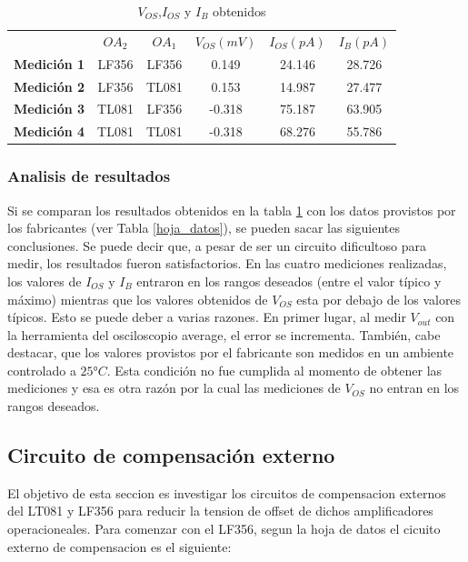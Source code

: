 \begin{table}[ht]
    \centering
    \caption{$V_{OS}$,$I_{OS}$ y $I_B$ obtenidos}
    \label{table5}
    \begin{tabular}{@{}cccccc@{}}
    \textbf{}           & \textbf{$OA_2$} & \textbf{$OA_1$} & \textbf{$V_{OS} (mV)$}   & \textbf{$I_{OS} (pA)$} & \textbf{$I_B (pA)$} \\ 
    \textbf{Medición 1} & LF356          & LF356      & 0.149                          & 24.146                 & 28.726             \\
    \textbf{Medición 2} & LF356          & TL081      & 0.153                          & 14.987                 & 27.477                  \\
    \textbf{Medición 3} & TL081          & LF356      & -0.318                         & 75.187                 & 63.905                  \\
    \textbf{Medición 4} & TL081          & TL081      & -0.318                         & 68.276                 & 55.786                  \\ 
    \end{tabular}
\end{table}


\subsubsection{Analisis de resultados}
Si se comparan los resultados obtenidos en la tabla \ref{table5} con los datos provistos por los fabricantes (ver Tabla \ref{hoja_datos}), se pueden sacar las siguientes conclusiones. Se puede decir que, a pesar de 
ser un circuito dificultoso para medir, los resultados fueron satisfactorios. En las cuatro mediciones realizadas, los valores de $I_{OS}$ y $I_B$ entraron en los rangos deseados (entre el valor típico y máximo) mientras 
que los valores obtenidos de $V_{OS}$ esta por debajo de los valores típicos. Esto se puede deber a varias razones. En primer lugar, al medir $V_{out}$ con la herramienta del osciloscopio average, el error se incrementa. También, cabe destacar, que
los valores provistos por el fabricante son medidos en un ambiente controlado a $25 °C$. Esta condición no fue cumplida al momento de obtener las mediciones y esa es otra razón por la cual las mediciones de $V_{OS}$ no entran en los rangos deseados.   

\subsection{Circuito de compensación externo}
El objetivo de esta seccion es investigar los circuitos de compensacion externos del LT081 y LF356 para reducir la tension de offset de dichos amplificadores operacioneales.
Para comenzar con el LF356, segun la hoja de datos el cicuito externo de compensacion es el siguiente: 

